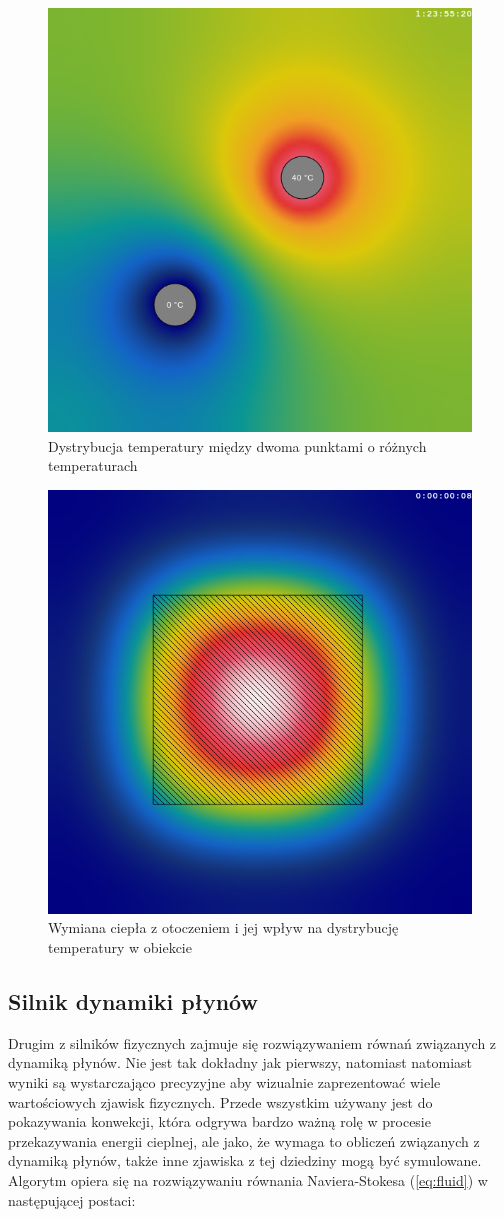 \begin{figure}[!h]
\centering
\includegraphics[width=.58\textwidth]{img/heatExample1}
\caption{Dystrybucja temperatury między dwoma punktami o różnych temperaturach}
\label{fig:heatExample1}
\end{figure}

\begin{figure}[!h]
\centering
\includegraphics[width=.58\textwidth]{img/heatExample2}
\caption{Wymiana ciepła z otoczeniem i jej wpływ na dystrybucję temperatury 
w obiekcie}
\label{fig:heatExample2}
\end{figure}

\clearpage

\subsection{Silnik dynamiki płynów}

Drugim z silników fizycznych zajmuje się rozwiązywaniem równań związanych z
dynamiką płynów. Nie jest tak dokładny jak pierwszy, natomiast natomiast wyniki
są wystarczająco precyzyjne aby wizualnie zaprezentować wiele wartościowych
zjawisk fizycznych. Przede wszystkim używany jest do pokazywania konwekcji,
która odgrywa bardzo ważną rolę w procesie przekazywania energii cieplnej, ale
jako, że wymaga to obliczeń związanych z dynamiką płynów, także inne zjawiska z
tej dziedziny mogą być symulowane. Algorytm opiera się na rozwiązywaniu równania
Naviera-Stokesa (\ref{eq:fluid}) w następującej postaci:


